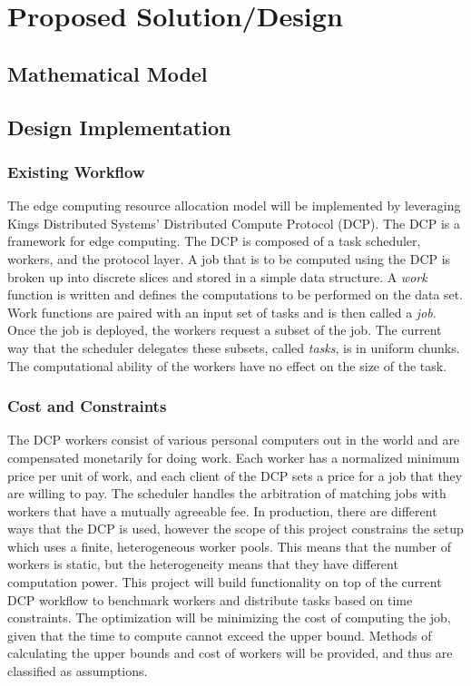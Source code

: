 \documentclass[../mthe-493-project-proposal.tex]{subfiles}
\begin{document}
    \chapter{Proposed Solution/Design}
    \label{ch:proposed-design}

    \section{Mathematical Model}
    \blindtext

    \section{Design Implementation}
    \subsection{Existing Workflow}

    The edge computing resource allocation model will be implemented by leveraging  Kings Distributed Systems' Distributed Compute Protocol (DCP). The DCP is a framework for edge computing. The DCP is composed of a task scheduler, workers, and the protocol layer. A job that is to be computed using the DCP is broken up into discrete slices and stored in a simple data structure. A \emph{work} function is written and defines the computations to be performed on the data set. Work functions are paired with an input set of tasks and is then called a \emph{job}. Once the job is deployed, the workers request a subset of the job. The current way that the scheduler delegates these subsets, called \emph{tasks}, is in uniform chunks. The computational ability of the workers have no effect on the size of the task.

    \subsection{Cost and Constraints}
    \label{ssec:costs-and-constraints}

    The DCP workers consist of various personal computers out in the world and are compensated monetarily for doing work. Each worker has a normalized minimum price per unit of work, and each client of the DCP sets a price for a job that they are willing to pay. The scheduler handles the arbitration of matching jobs with workers that have a mutually agreeable fee. In production, there are different ways that the DCP is used, however the scope of this project constrains the setup which uses a finite, heterogeneous worker pools. This means that the number of workers is static, but the heterogeneity means that they have different computation power. This project will build functionality on top of the current DCP workflow to benchmark workers and distribute tasks based on time constraints. The optimization will be minimizing the cost of computing the job, given that the time to compute cannot exceed the upper bound. Methods of calculating the upper bounds and cost of workers will be provided, and thus are classified as assumptions.
\end{document}
